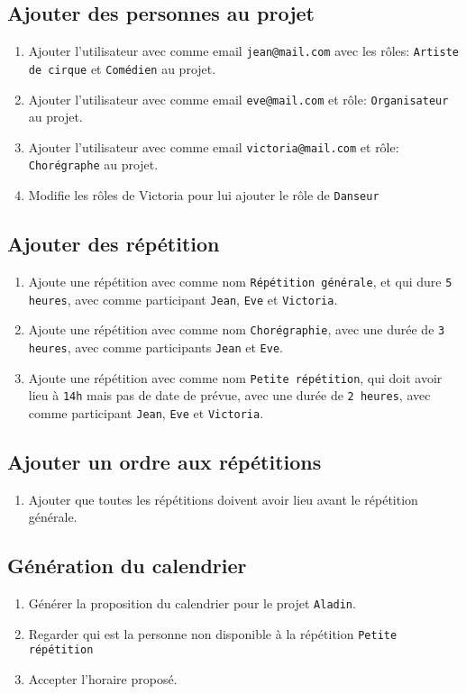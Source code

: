 \documentclass[11pt]{article}
\begin{document}
\subsection{Ajouter des personnes au projet}
\begin{enumerate}
    \item Ajouter l'utilisateur avec comme email \texttt{jean@mail.com} avec les rôles: \texttt{Artiste de cirque} et \texttt{Comédien} au projet.
    \item Ajouter l'utilisateur avec comme email \texttt{eve@mail.com} et rôle: \texttt{Organisateur} au projet.
    \item Ajouter l'utilisateur avec comme email \texttt{victoria@mail.com} et rôle: \texttt{Chorégraphe} au projet.
    \item Modifie les rôles de Victoria pour lui ajouter le rôle de \texttt{Danseur}
\end{enumerate}
\subsection{Ajouter des répétition}
\begin{enumerate}
    \item Ajoute une répétition avec comme nom \texttt{Répétition générale}, et qui dure \texttt{5 heures}, avec comme participant \texttt{Jean}, \texttt{Eve} et \texttt{Victoria}.
    \item Ajoute une répétition avec comme nom \texttt{Chorégraphie}, avec une durée de \texttt{3 heures}, avec comme participants \texttt{Jean} et \texttt{Eve}.
    \item Ajoute une répétition avec comme nom \texttt{Petite répétition}, qui doit avoir lieu à \texttt{14h} mais pas de date de prévue, avec une durée de \texttt{2 heures}, avec comme participant \texttt{Jean}, \texttt{Eve} et \texttt{Victoria}.
\end{enumerate}
\subsection{Ajouter un ordre aux répétitions}
\begin{enumerate}
    \item Ajouter que toutes les répétitions doivent avoir lieu avant le répétition générale.
\end{enumerate}
\subsection{Génération du calendrier}
\begin{enumerate}
    \item Générer la proposition du calendrier pour le projet \texttt{Aladin}.
    \item Regarder qui est la personne non disponible à la répétition \texttt{Petite répétition} 
    \item Accepter l'horaire proposé.
\end{enumerate}
\end{document}
